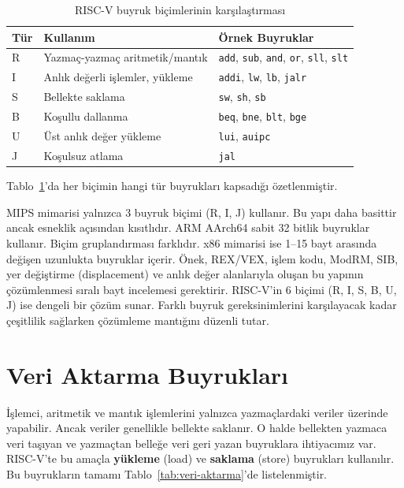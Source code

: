 \begin{table}[H]
\centering
\caption{RISC-V buyruk biçimlerinin karşılaştırması}
\label{tab:riscv-buyruk-bicimleri-tablo}
\small
\begin{tabular}{llp{7cm}}
\toprule
\textbf{Tür} & \textbf{Kullanım} & \textbf{Örnek Buyruklar} \\
\midrule
R & Yazmaç-yazmaç aritmetik/mantık & \texttt{add}, \texttt{sub}, \texttt{and}, \texttt{or}, \texttt{sll}, \texttt{slt} \\
I & Anlık değerli işlemler, yükleme & \texttt{addi}, \texttt{lw}, \texttt{lb}, \texttt{jalr} \\
S & Bellekte saklama & \texttt{sw}, \texttt{sh}, \texttt{sb} \\
B & Koşullu dallanma & \texttt{beq}, \texttt{bne}, \texttt{blt}, \texttt{bge} \\
U & Üst anlık değer yükleme & \texttt{lui}, \texttt{auipc} \\
J & Koşulsuz atlama & \texttt{jal} \\
\bottomrule
\end{tabular}
\end{table}


Tablo~\ref{tab:riscv-buyruk-bicimleri-tablo}'da her biçimin hangi tür buyrukları kapsadığı özetlenmiştir.

\begin{karsilastirma}
MIPS mimarisi yalnızca 3 buyruk biçimi (R, I, J) kullanır. Bu yapı daha basittir ancak esneklik açısından kısıtlıdır. ARM AArch64 sabit 32 bitlik buyruklar kullanır. Biçim gruplandırması farklıdır. x86 mimarisi ise 1–15 bayt arasında değişen uzunlukta buyruklar içerir. Önek, REX/VEX, işlem kodu, ModRM, SIB, yer değiştirme (displacement) ve anlık değer alanlarıyla oluşan bu yapının çözümlenmesi sıralı bayt incelemesi gerektirir. RISC-V'in 6 biçimi (R, I, S, B, U, J) ise dengeli bir çözüm sunar. Farklı buyruk gereksinimlerini karşılayacak kadar çeşitlilik sağlarken çözümleme mantığını düzenli tutar.
\end{karsilastirma}

\section{Veri Aktarma Buyrukları}
\label{sec:veri-aktarma}

İşlemci, aritmetik ve mantık işlemlerini yalnızca yazmaçlardaki veriler üzerinde yapabilir. Ancak veriler genellikle bellekte saklanır. O halde bellekten yazmaca veri taşıyan ve yazmaçtan belleğe veri geri yazan buyruklara ihtiyacımız var. RISC-V'te bu amaçla \textbf{yükleme} (load) ve \textbf{saklama} (store) buyrukları kullanılır. Bu buyrukların tamamı Tablo~\ref{tab:veri-aktarma}'de listelenmiştir.

